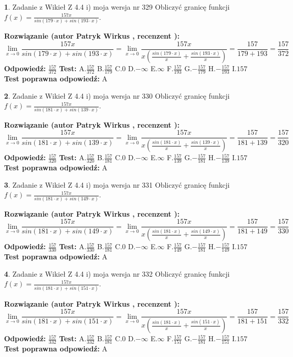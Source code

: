 \documentclass[12pt, a4paper]{article}
\theoremstyle{definition} %
\newtheorem{zad}{}
\newcommand{\zadStart}[1]{\begin{zad}#1\newline}
\newcommand{\zadStop}{\end{zad}}
\newcommand{\rozwStart}[2]{\noindent \textbf{Rozwiązanie (autor #1 , recenzent #2): }\newline}
\newcommand{\rozwStop}{\newline}
\newcommand{\odpStart}{\noindent \textbf{Odpowiedź:}\newline}
\newcommand{\odpStop}{\newline}
\newcommand{\testStart}{\noindent \textbf{Test:}\newline}
\newcommand{\testStop}{\newline}
\newcommand{\kluczStart}{\noindent \textbf{Test poprawna odpowiedź:}\newline}
\newcommand{\kluczStop}{\newline}
\begin{document}
\zadStart{Zadanie z Wikieł Z 4.4 i) moja wersja nr 329}
Obliczyć granicę funkcji $f(x)=\frac{157x}{sin(179\cdot x) +sin(193\cdot x)}$.
\zadStop
\rozwStart{Patryk Wirkus}{}
$$\lim\limits_{x\to 0}\frac{157x}{sin(179\cdot x) +sin(193\cdot x)}=\lim\limits_{x\to 0}\frac{157x}{x(\frac{sin(179\cdot x)}{x}+\frac{sin(193\cdot x)}{x})}=\frac{157}{179+193} = \frac{157}{372}$$
\rozwStop
\odpStart
$\frac{157}{372}$
\odpStop
\testStart
A.$\frac{157}{372}$
B.$\frac{157}{179}$
C.$0$
D.$-\infty$
E.$\infty$
F.$\frac{157}{193}$
G.$-\frac{157}{179}$
H.$-\frac{157}{193}$
I.$157$
\testStop
\kluczStart
A
\kluczStop



\zadStart{Zadanie z Wikieł Z 4.4 i) moja wersja nr 330}
Obliczyć granicę funkcji $f(x)=\frac{157x}{sin(181\cdot x) +sin(139\cdot x)}$.
\zadStop
\rozwStart{Patryk Wirkus}{}
$$\lim\limits_{x\to 0}\frac{157x}{sin(181\cdot x) +sin(139\cdot x)}=\lim\limits_{x\to 0}\frac{157x}{x(\frac{sin(181\cdot x)}{x}+\frac{sin(139\cdot x)}{x})}=\frac{157}{181+139} = \frac{157}{320}$$
\rozwStop
\odpStart
$\frac{157}{320}$
\odpStop
\testStart
A.$\frac{157}{320}$
B.$\frac{157}{181}$
C.$0$
D.$-\infty$
E.$\infty$
F.$\frac{157}{139}$
G.$-\frac{157}{181}$
H.$-\frac{157}{139}$
I.$157$
\testStop
\kluczStart
A
\kluczStop



\zadStart{Zadanie z Wikieł Z 4.4 i) moja wersja nr 331}
Obliczyć granicę funkcji $f(x)=\frac{157x}{sin(181\cdot x) +sin(149\cdot x)}$.
\zadStop
\rozwStart{Patryk Wirkus}{}
$$\lim\limits_{x\to 0}\frac{157x}{sin(181\cdot x) +sin(149\cdot x)}=\lim\limits_{x\to 0}\frac{157x}{x(\frac{sin(181\cdot x)}{x}+\frac{sin(149\cdot x)}{x})}=\frac{157}{181+149} = \frac{157}{330}$$
\rozwStop
\odpStart
$\frac{157}{330}$
\odpStop
\testStart
A.$\frac{157}{330}$
B.$\frac{157}{181}$
C.$0$
D.$-\infty$
E.$\infty$
F.$\frac{157}{149}$
G.$-\frac{157}{181}$
H.$-\frac{157}{149}$
I.$157$
\testStop
\kluczStart
A
\kluczStop



\zadStart{Zadanie z Wikieł Z 4.4 i) moja wersja nr 332}
Obliczyć granicę funkcji $f(x)=\frac{157x}{sin(181\cdot x) +sin(151\cdot x)}$.
\zadStop
\rozwStart{Patryk Wirkus}{}
$$\lim\limits_{x\to 0}\frac{157x}{sin(181\cdot x) +sin(151\cdot x)}=\lim\limits_{x\to 0}\frac{157x}{x(\frac{sin(181\cdot x)}{x}+\frac{sin(151\cdot x)}{x})}=\frac{157}{181+151} = \frac{157}{332}$$
\rozwStop
\odpStart
$\frac{157}{332}$
\odpStop
\testStart
A.$\frac{157}{332}$
B.$\frac{157}{181}$
C.$0$
D.$-\infty$
E.$\infty$
F.$\frac{157}{151}$
G.$-\frac{157}{181}$
H.$-\frac{157}{151}$
I.$157$
\testStop
\kluczStart
A
\kluczStop
\end{document}
